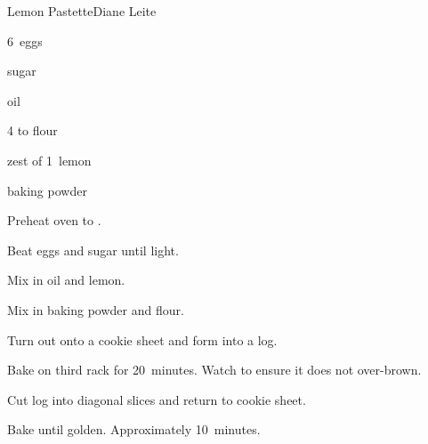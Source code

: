 \begin{recipe}{Lemon Pastette}{Diane Leite}{}

\begin{ingredients}
\item 6~eggs
\item \C{1\half} sugar
\item \C{\threequarter} oil
\item 4 to  flour
\item zest of 1~lemon
\item {} baking powder
\end{ingredients}

\begin{directions}
\item Preheat oven to .
\item Beat eggs and sugar until light.
\item Mix in oil and lemon.
\item Mix in baking powder and flour.
\item Turn out onto a cookie sheet and form into a log.
\item Bake on third rack for 20~minutes. Watch to ensure it does not over-brown.
\item Cut log into diagonal slices and return to cookie sheet.
\item Bake until golden. Approximately 10~minutes.
\end{directions}
\end{recipe}
